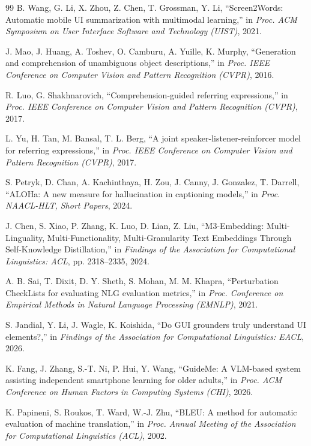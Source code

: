 \begin{thebibliography}{99}
 B. Wang, G. Li, X. Zhou, Z. Chen, T. Grossman, Y. Li,
``Screen2Words: Automatic mobile UI summarization with multimodal learning,'' in
\emph{Proc. ACM Symposium on User Interface Software and Technology (UIST)}, 2021.

 J. Mao, J. Huang, A. Toshev, O. Camburu, A. Yuille, K. Murphy,
``Generation and comprehension of unambiguous object descriptions,'' in \emph{Proc. IEEE
Conference on Computer Vision and Pattern Recognition (CVPR)}, 2016.

 R. Luo, G. Shakhnarovich, ``Comprehension-guided referring
expressions,'' in \emph{Proc. IEEE Conference on Computer Vision and Pattern Recognition
(CVPR)}, 2017.

 L. Yu, H. Tan, M. Bansal, T. L. Berg, ``A joint
speaker-listener-reinforcer model for referring expressions,'' in \emph{Proc. IEEE
Conference on Computer Vision and Pattern Recognition (CVPR)}, 2017.

 S. Petryk, D. Chan, A. Kachinthaya, H. Zou, J. Canny, J. Gonzalez,
T. Darrell, ``ALOHa: A new measure for hallucination in captioning models,'' in
\emph{Proc. NAACL-HLT, Short Papers}, 2024.

 J. Chen, S. Xiao, P. Zhang, K. Luo, D. Lian, Z. Liu,
``M3-Embedding: Multi-Linguality, Multi-Functionality, Multi-Granularity Text Embeddings
Through Self-Knowledge Distillation,'' in \emph{Findings of the Association for
Computational Linguistics: ACL}, pp. 2318--2335, 2024.

 A. B. Sai, T. Dixit, D. Y. Sheth, S. Mohan, M. M. Khapra,
``Perturbation CheckLists for evaluating NLG evaluation metrics,'' in \emph{Proc.
Conference on Empirical Methods in Natural Language Processing (EMNLP)}, 2021.

 S. Jandial, Y. Li, J. Wagle, K. Koishida, ``Do GUI
grounders truly understand UI elements?,'' in \emph{Findings of the Association for
Computational Linguistics: EACL}, 2026.

 K. Fang, J. Zhang, S.-T. Ni, P. Hui, Y. Wang, ``GuideMe: A VLM-based
system assisting independent smartphone learning for older adults,'' in \emph{Proc. ACM
Conference on Human Factors in Computing Systems (CHI)}, 2026.

 K. Papineni, S. Roukos, T. Ward, W.-J. Zhu, ``BLEU: A method for
automatic evaluation of machine translation,'' in \emph{Proc. Annual Meeting of the
Association for Computational Linguistics (ACL)}, 2002.


\end{thebibliography}
